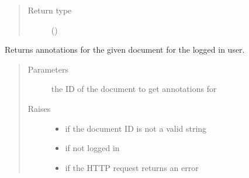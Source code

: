 \documentclass[letterpaper,10pt,english]{sphinxmanual}
\begin{document}
\begin{fulllineitems}
\begin{fulllineitems}
\begin{quote}
\begin{description}
\item[{Return type}] \leavevmode
\sphinxAtStartPar
{}()

\end{description}\end{quote}

\end{fulllineitems}


\begin{fulllineitems}
\label{\detokenize{autoapi/pine/client/index:pine.client.PineClient.get_my_document_annotations}}
\sphinxAtStartPar
Returns annotations for the given document for the logged in user.
\begin{quote}\begin{description}
\item[{Parameters}] \leavevmode
\sphinxAtStartPar
{} \textendash{} the ID of the document to get annotations for

\item[{Raises}] \leavevmode\begin{itemize}
\item {} 
\sphinxAtStartPar
{\hyperref[\detokenize{autoapi/pine/client/exceptions/index:pine.client.exceptions.PineClientValueException}]{}} \textendash{} if the document ID is not a valid string

\item {} 
\sphinxAtStartPar
{\hyperref[\detokenize{autoapi/pine/client/exceptions/index:pine.client.exceptions.PineClientAuthException}]{}} \textendash{} if not logged in

\item {} 
\sphinxAtStartPar
{\hyperref[\detokenize{autoapi/pine/client/exceptions/index:pine.client.exceptions.PineClientHttpException}]{}} \textendash{} if the HTTP request returns an error


\end{itemize}
\end{description}
\end{quote}
\end{fulllineitems}
\end{fulllineitems}
\end{document}
